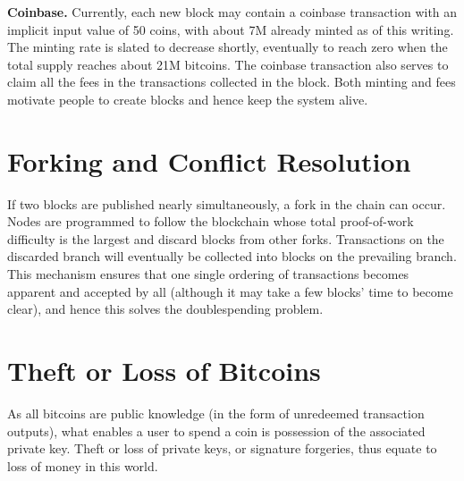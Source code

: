 \textbf{Coinbase.} Currently, each new block may contain a coinbase transaction with an implicit
input value of 50 coins, with about 7M already minted as of this writing. The
minting rate is slated to decrease shortly, eventually to reach zero when the total supply
reaches about 21M bitcoins. The coinbase transaction also serves to claim all the fees in
the transactions collected in the block. Both minting and fees motivate people to create
blocks and hence keep the system alive.

\section{Forking and Conflict Resolution}
If two blocks are published nearly simultaneously, a fork in the chain can occur. Nodes
are programmed to follow the blockchain whose total proof-of-work difficulty is the
largest and discard blocks from other forks. Transactions on the discarded branch will
eventually be collected into blocks on the prevailing branch. This mechanism ensures
that one single ordering of transactions becomes apparent and accepted by all (although
it may take a few blocks’ time to become clear), and hence this solves the doublespending
problem.

\section{Theft or Loss of Bitcoins}
As all bitcoins are public knowledge (in the form of unredeemed transaction outputs),
what enables a user to spend a coin is possession of the associated private key. Theft or
loss of private keys, or signature forgeries, thus equate to loss of money in this world.


